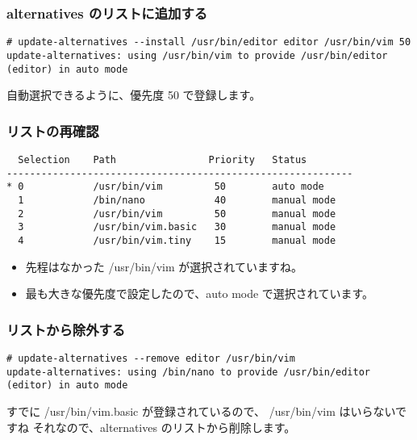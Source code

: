 \documentclass[cjk,dvipdfmx,12pt,compress,%
hyperref={bookmarks=true,bookmarksnumbered=true,bookmarksopen=false,%
colorlinks=false,%
pdftitle={第 120 回 関西 Debian 勉強会},%
pdfauthor={倉敷・のがた・佐々木・かわだ・おおつき},%
pdfsubject={資料},%
}]{beamer}
\begin{document}
\begin{frame}[fragile]
  \frametitle{alternatives のリストに追加する}
\begin{tiny}
\begin{verbatim}
# update-alternatives --install /usr/bin/editor editor /usr/bin/vim 50
update-alternatives: using /usr/bin/vim to provide /usr/bin/editor (editor) in auto mode
\end{verbatim}
\end{tiny}
自動選択できるように、優先度 50 で登録します。
\end{frame}

\begin{frame}[fragile]
  \frametitle{リストの再確認}
\begin{tiny}
\begin{verbatim}
  Selection    Path                Priority   Status
------------------------------------------------------------
* 0            /usr/bin/vim         50        auto mode
  1            /bin/nano            40        manual mode
  2            /usr/bin/vim         50        manual mode
  3            /usr/bin/vim.basic   30        manual mode
  4            /usr/bin/vim.tiny    15        manual mode
\end{verbatim}
\end{tiny}
\begin{itemize}
 \item 先程はなかった /usr/bin/vim が選択されていますね。
 \item 最も大きな優先度で設定したので、auto mode で選択されています。
\end{itemize}
\end{frame}

\begin{frame}[fragile]
  \frametitle{リストから除外する}
\begin{tiny}
\begin{verbatim}
# update-alternatives --remove editor /usr/bin/vim
update-alternatives: using /bin/nano to provide /usr/bin/editor (editor) in auto mode
\end{verbatim}
\end{tiny}
すでに /usr/bin/vim.basic が登録されているので、 /usr/bin/vim はいらないですね
それなので、alternatives のリストから削除します。
\end{frame}
\end{document}
